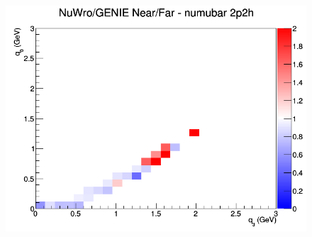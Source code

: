 \begin{figure}[h]
\endminipage
{}
\includegraphics[width=\linewidth]{q0_q3/nominal/ratios/2p2h_NuWro_GENIE_numubar_NF_q3_q0.png}
\endminipage
\newline
\end{figure}
\clearpage
